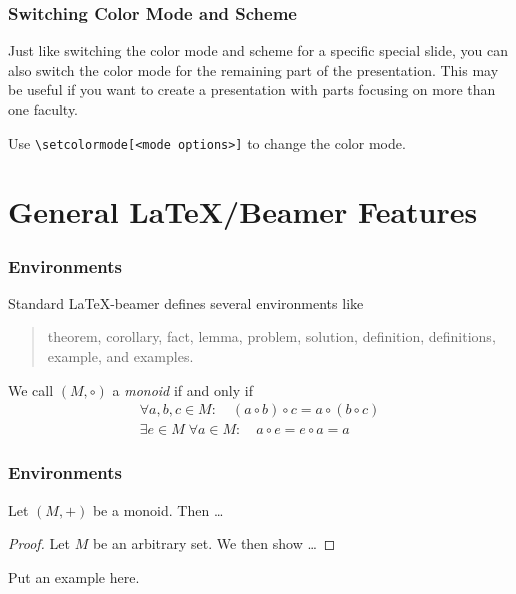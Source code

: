 \documentclass[utf8,aspectratio=169,ngerman,english]{beamer}
\begin{document}
\jkulogo
\jkulogo[light]
\jkulogo[dark]
\jkulogo[gray]
\jkulogo[black]


\begin{frame}[containsverbatim]
\frametitle{Switching Color Mode and Scheme}

Just like switching the color mode and scheme for a specific special slide, you can also switch the color mode for the remaining part of the presentation. This may be useful if you want to create a presentation with parts focusing on more than one faculty.

Use \verb|\setcolormode[<mode options>]| to change the color mode.
\end{frame}






\section{General \LaTeX/Beamer Features}


\begin{frame}
\frametitle{Environments}

Standard \LaTeX-beamer defines several environments like
\begin{quote}
theorem, corollary, fact, lemma, problem, solution, definition, definitions, example, and examples.
\end{quote}

\begin{definition}[Monoid]
We call $(M,\circ)$ a \emph{monoid} if and only if
\begin{gather*}
\forall a,b,c\in M:\quad(a\circ b)\circ c = a\circ(b\circ c) \tag{associativity}\\
\exists e\in M \;\forall a\in M:\quad a\circ e = e\circ a= a \tag{neutral element}
\end{gather*}
\end{definition}
\end{frame}

\begin{frame}
\frametitle{Environments}

\begin{theorem}
Let $(M,+)$ be a monoid. Then \ldots
\end{theorem}

\begin{proof}
Let $M$ be an arbitrary set. We then show \ldots
\end{proof}

\begin{example}
Put an example here.
\end{example}
\end{frame}
\end{document}
